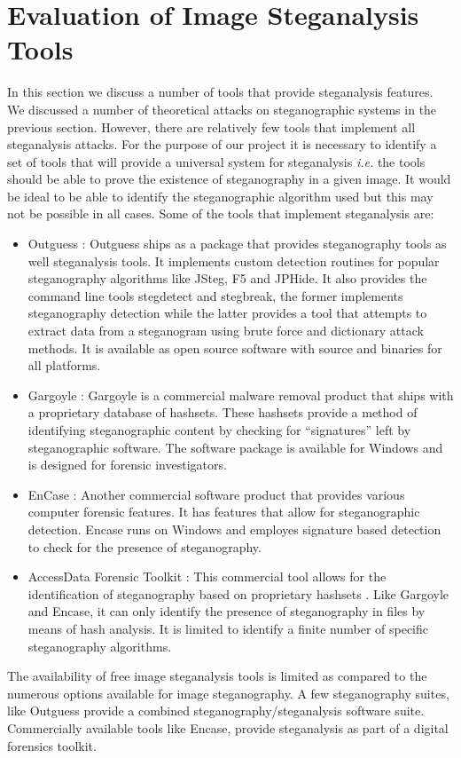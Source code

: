 \documentclass[12pt]{extreport}
\begin{document}
\section{Evaluation of Image Steganalysis Tools}
\label{sec:steganalysistools}
In this section we discuss a number of tools that provide steganalysis features. We discussed a number of theoretical attacks on steganographic systems in the previous section. However, there are relatively few tools that implement all steganalysis attacks. For the purpose of our project it is necessary to identify a set of tools that will provide a universal system for steganalysis \emph{i.e.} the tools should be able to prove the existence of steganography in a given image. It would be ideal to be able to identify the steganographic algorithm used but this may not be possible in all cases. Some of the tools that implement steganalysis are:
\begin{itemize}
\item Outguess : Outguess \cite{outguess} ships as a package that provides steganography tools as well steganalysis tools. It implements custom detection routines for popular steganography algorithms like JSteg, F5 and JPHide. It also provides the command line tools stegdetect and stegbreak, the former implements steganography detection while the latter provides a tool that attempts to extract data from a steganogram using brute force and dictionary attack methods. It is available as open source software with source and binaries for all platforms. 
\item Gargoyle : Gargoyle \cite{gargoyle} is a commercial malware removal product that ships with a proprietary database of hashsets. These hashsets provide a method of identifying steganographic content by checking for ``signatures'' left by steganographic software. The software package is available for Windows and is designed for forensic investigators.
\item EnCase : Another commercial software product \cite{encase} that provides various  computer forensic features. It has features that allow for steganographic detection. Encase runs on Windows and employes signature based detection to check for the presence of steganography.
\item AccessData Forensic Toolkit :  This commercial tool allows for the identification of steganography based on proprietary hashsets \cite{ftk}. Like Gargoyle and Encase, it can only identify the presence of steganography in files by means of hash analysis. It is limited to identify a finite number of specific steganography algorithms. 
 
\end{itemize}
The availability of free image steganalysis tools is limited as compared to the numerous options available for image steganography. A few steganography suites, like Outguess \cite{outguess} provide a combined steganography/steganalysis software suite. Commercially available tools like Encase, provide steganalysis as part of a digital forensics toolkit.  
\end{document}
